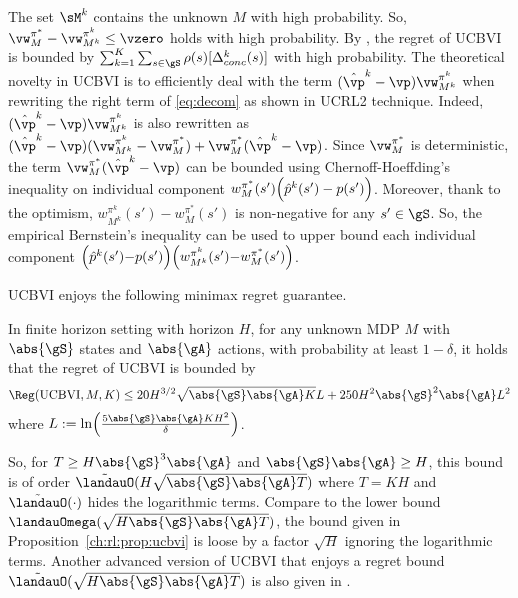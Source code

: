 The set $\sM^k$ contains the unknown $M$ with high probability. So, $\vw^{\pi^*}_M- \vw^{\pi^k}_{M^k}\le \vzero$ holds with high probability.
By , the regret of UCBVI is bounded by ${\sum_{k=1}^K\sum_{s\in\gS}\rho(s)[\Delta_{conc}^k(s)]}$ with high probability.
The theoretical novelty in UCBVI is to efficiently deal with the term $(\hat{\vp}^k-\vp)\vw^{\pi^k}_{M^k}$ when rewriting the right term of \eqref{eq:decom} as shown in UCRL2 technique.
Indeed, $(\hat{\vp}^k-\vp)\vw^{\pi^k}_{M^k}$ is also rewritten as $(\hat{\vp}^k-\vp)(\vw^{\pi^k}_{M^k}-\vw^{\pi^*}_{M}) +\vw^{\pi^*}_{M}(\hat{\vp}^k-\vp)$.
Since $\vw^{\pi^*}_M$ is deterministic, the term $\vw^{\pi^*}_{M}(\hat{\vp}^k-\vp)$ can be bounded using Chernoff-Hoeffding's inequality on individual component $w^{\pi^*}_{M}(s')\Bigl(\hat{p}^k(s')-p(s')\Bigr)$.
Moreover, thank to the optimism, $w^{\pi^k}_{M^k}(s')-w^{\pi^*}_{M}(s')$ is non-negative for any $s'\in\gS$.
So, the empirical Bernstein's inequality can be used to upper bound each individual component $\Bigl(\hat{p}^k(s'){-}p(s')\Bigr)\Bigl(w^{\pi^k}_{M^k}(s'){-}w^{\pi^*}_{M}(s')\Bigr)$.

UCBVI enjoys the following minimax regret guarantee.
\begin{prop}
    \label{ch:rl:prop:ucbvi}
    In finite horizon setting with horizon $H$, for any unknown MDP $M$ with $\abs{\gS}$ states and $\abs{\gA}$ actions,
    with probability at least $1-\delta$, it holds that the regret of UCBVI is bounded by
    \begin{align*}
        \Reg(\mathrm{UCBVI}, M, K) \le 20H^{3/2}\sqrt{\abs{\gS}\abs{\gA}K}L +250H^2\abs{\gS}^2\abs{\gA}L^2
    \end{align*}
    where $L:=\ln\Bigl(\frac{5\abs{\gS}\abs{\gA}KH^2}{\delta}\Bigr)$.
\end{prop}
So, for $T\ge H\abs{\gS}^3\abs{\gA}$ and $\abs{\gS}\abs{\gA}\ge H$, this bound is of order $\tilde{\landauO}(H\sqrt{\abs{\gS}\abs{\gA}T})$ where $T=KH$ and $\tilde{\landauO}(\cdot)$ hides the logarithmic terms.
Compare to the lower bound $\landauOmega(\sqrt{H\abs{\gS}\abs{\gA}T})$, the bound given in Proposition~\ref{ch:rl:prop:ucbvi} is loose by a factor $\sqrt{H}$ ignoring the logarithmic terms.
Another advanced version of UCBVI that enjoys a regret bound $\tilde{\landauO}(\sqrt{H\abs{\gS}\abs{\gA}T})$ is also given in \cite{azar2017minimax}.%

